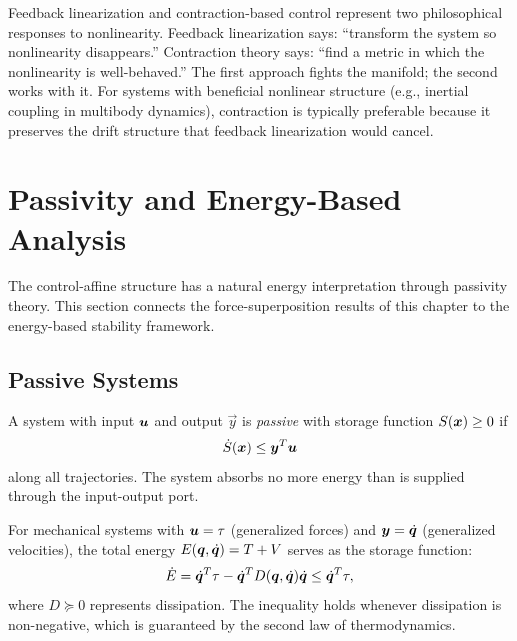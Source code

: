 \begin{designbox}
Feedback linearization and contraction-based control represent two philosophical
responses to nonlinearity. Feedback linearization says: ``transform the system so
nonlinearity disappears.'' Contraction theory says: ``find a metric in which the
nonlinearity is well-behaved.'' The first approach fights the manifold; the second
works with it. For systems with beneficial nonlinear structure (e.g., inertial
coupling in multibody dynamics), contraction is typically preferable because it
preserves the drift structure that feedback linearization would cancel.
\end{designbox}


\section{Passivity and Energy-Based Analysis}

The control-affine structure has a natural energy interpretation through passivity
theory. This section connects the force-superposition results of this chapter to
the energy-based stability framework.

\subsection{Passive Systems}

\begin{definition}[Passivity]
\label{def:ch3:passivity}
A system with input $\bm{u}$ and output $\vec{y}$ is \emph{passive} with storage
function $S(\bm{x}) \geq 0$ if
\begin{equation}
\dot{S}(\bm{x}) \leq \bm{y}^T \bm{u}
\label{eq:ch3:passivity}
\end{equation}
along all trajectories. The system absorbs no more energy than is supplied through
the input-output port.
\end{definition}

For mechanical systems with $\bm{u} = \tau$ (generalized forces) and $\bm{y} = \dot{\bm{q}}$
(generalized velocities), the total energy $E(\bm{q}, \dot{\bm{q}}) = T + V$ serves as the
storage function:
\begin{equation}
\dot{E} = \dot{\bm{q}}^T \tau - \dot{\bm{q}}^T D(\bm{q}, \dot{\bm{q}}) \dot{\bm{q}} \leq \dot{\bm{q}}^T \tau,
\label{eq:ch3:mech-passivity}
\end{equation}
where $D \succeq 0$ represents dissipation. The inequality holds whenever dissipation
is non-negative, which is guaranteed by the second law of thermodynamics.

